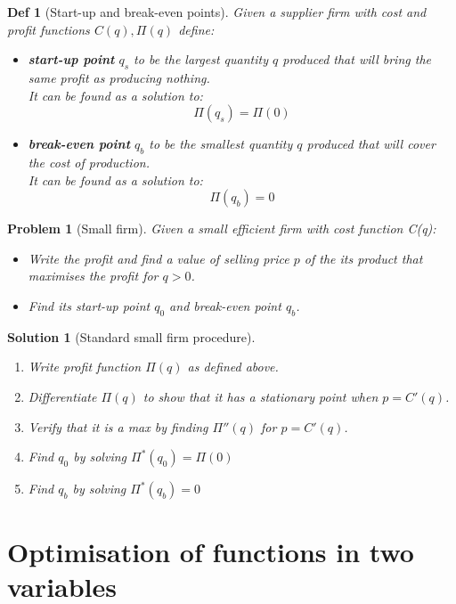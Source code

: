 \documentclass[11pt,a4paper, margin]{article}
\theoremstyle{break}
\newtheorem*{problem}{Problem}
\theoremstyle{break}
\newtheorem*{solution}{Solution}
\newtheorem*{definition}{Def}
\begin{document}
\begin{definition} [Start-up and break-even points]

Given a supplier firm with cost and profit functions $C(q), \Pi(q)$ define:

\begin{itemize}
	\item \textbf{start-up point} $q_s$ to be the largest quantity $q$ produced that will bring the same profit as producing nothing. \\It can be found as a solution to:
\[\Pi(q_s) = \Pi(0)\]
	\item \textbf{break-even point} $q_b$ to be the smallest quantity $q$ produced that will cover the cost of production. \\It can be found as a solution to:
\[\Pi(q_b) = 0\]
\end{itemize} 
\end{definition}

\begin{problem} [Small firm]
Given a small efficient firm with cost function C(q):
\begin{itemize}
	\item Write the profit and find a value of selling price $p$ of the its product that maximises the profit for $q>0$.
	\item Find its start-up point $q_0$ and break-even point $q_b$. 
\end{itemize}
\end{problem}

\begin{solution} [Standard small firm procedure]
\begin{enumerate}
	\item Write profit function $\Pi(q)$ as defined above.
	\item Differentiate $\Pi(q)$ to show that it has a stationary point when $p = C'(q)$.
	\item Verify that it is a max by finding $\Pi''(q)$ for $p = C'(q)$.
	\item Find $q_0$ by solving $\Pi^\ast(q_0) = \Pi(0)$
	\item Find $q_b$ by solving $\Pi^\ast(q_b) = 0$
\end{enumerate}
\end{solution}

\section{Optimisation of functions in two variables}
\end{document}
